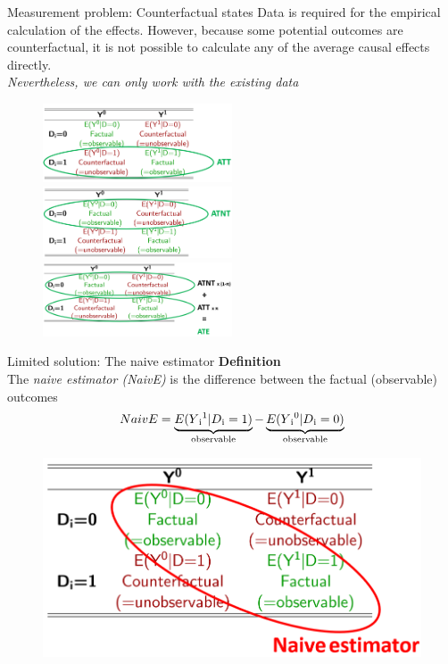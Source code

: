\documentclass{beamer}\usepackage[]{graphicx}\usepackage[]{xcolor}
\begin{document}
\begin{frame}{Measurement problem: Counterfactual states}
Data is required for the empirical calculation of the effects. However, because some potential outcomes are counterfactual, it is not possible to calculate any of the average causal effects directly. \\
\textit{Nevertheless, we can only work with the existing data}

\begin{figure}
\centering
\includegraphics[width=0.5\textwidth]{Graphics/ATT.png}
\includegraphics[width=0.5\textwidth]{Graphics/ATNT.png}
\includegraphics[width=0.5\textwidth]{Graphics/ATE.png}
\end{figure}
\end{frame}


\begin{frame}{Limited solution: The naive estimator}
\textbf{Definition}\\
The \textit{naive estimator (NaivE)} is the difference between the factual (observable) outcomes
\begin{align*}
NaivE = \underbrace{E(Y\textsubscript{i}\textsuperscript{1} \vert D\textsubscript{i}=1)}_\text{observable} - \underbrace{E(Y\textsubscript{i}\textsuperscript{0} \vert D\textsubscript{i}=0)}_\text{observable}
\end{align*}
\begin{figure}
\centering
\includegraphics[width=1\textwidth]{Graphics/Naive.png}
\end{figure}
\end{frame}
\end{document}
